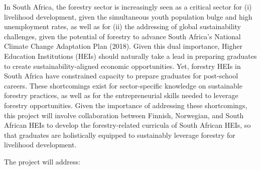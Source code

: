 \documentclass[
  11pt,
]{article}
\begin{document}
In South Africa, the forestry sector is increasingly seen as a critical
sector for (i) livelihood development, given the simultaneous youth
population bulge and high unemployment rates, as well as for (ii) the
addressing of global sustainability challenges, given the potential of
forestry to advance South Africa's National Climate Change Adaptation
Plan (2018). Given this dual importance, Higher Education Institutions
(HEIs) should naturally take a lead in preparing graduates to create
sustainability-aligned economic opportunities. Yet, forestry HEIs in
South Africa have constrained capacity to prepare graduates for
post-school careers. These shortcomings exist for sector-specific
knowledge on sustainable forestry practices, as well as for the
entrepreneurial skills needed to leverage forestry opportunities. Given
the importance of addressing these shortcomings, this project will
involve collaboration between Finnish, Norwegian, and South African HEIs
to develop the forestry-related curricula of South African HEIs, so that
graduates are holistically equipped to sustainably leverage forestry for
livelihood development.

The project will address:
\end{document}
